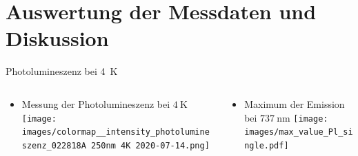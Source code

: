 \section{Auswertung der Messdaten und Diskussion}

\begin{frame}{Photolumineszenz bei \SI{4}{\kelvin}}
    \pause
    \begin{columns}
        \begin{column}{0.5\textwidth}
            \begin{itemize}
                \item <1-> Messung der Photolumineszenz bei $\SI{4}{\kelvin}$ 
                \centering
                 {
                \texttt{[image: images/colormap\_\_intensity\_photolumineszenz\_022818A 250nm 4K 2020-07-14.png]}\\[-0.5\baselineskip]                
                }
            \end{itemize}
        \end{column}
        \begin{column}{0.5\textwidth}
            \begin{itemize}
                \item <3-> Maximum der Emission bei $\SI{737}{\nano\meter}$ 
                \centering
                 {
                \texttt{[image: images/max\_value\_Pl\_single.pdf]}\\[-0.5\baselineskip]       
                }
            \end{itemize}
        \end{column}
    \end{columns}
\end{frame}

